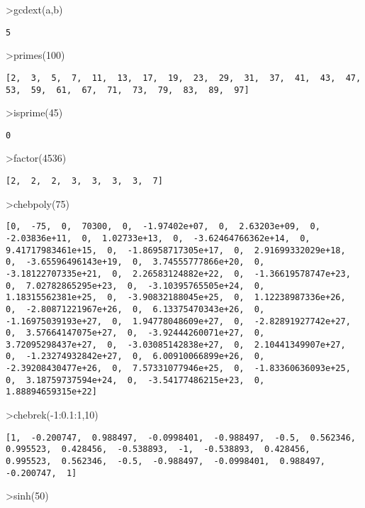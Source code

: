 \documentclass[
]{book}
\begin{document}
\textgreater gcdext(a,b)

\begin{verbatim}
5
\end{verbatim}

\textgreater primes(100)

\begin{verbatim}
[2,  3,  5,  7,  11,  13,  17,  19,  23,  29,  31,  37,  41,  43,  47,
53,  59,  61,  67,  71,  73,  79,  83,  89,  97]
\end{verbatim}

\textgreater isprime(45)

\begin{verbatim}
0
\end{verbatim}

\textgreater factor(4536)

\begin{verbatim}
[2,  2,  2,  3,  3,  3,  3,  7]
\end{verbatim}

\textgreater chebpoly(75)

\begin{verbatim}
[0,  -75,  0,  70300,  0,  -1.97402e+07,  0,  2.63203e+09,  0,
-2.03836e+11,  0,  1.02733e+13,  0,  -3.62464766362e+14,  0,
9.41717983461e+15,  0,  -1.86958717305e+17,  0,  2.91699332029e+18,
0,  -3.65596496143e+19,  0,  3.74555777866e+20,  0,
-3.18122707335e+21,  0,  2.26583124882e+22,  0,  -1.36619578747e+23,
0,  7.02782865295e+23,  0,  -3.10395765505e+24,  0,
1.18315562381e+25,  0,  -3.90832188045e+25,  0,  1.12238987336e+26,
0,  -2.80871221967e+26,  0,  6.13375470343e+26,  0,
-1.16975039193e+27,  0,  1.94778048609e+27,  0,  -2.82891927742e+27,
0,  3.57664147075e+27,  0,  -3.92444260071e+27,  0,
3.72095298437e+27,  0,  -3.03085142838e+27,  0,  2.10441349907e+27,
0,  -1.23274932842e+27,  0,  6.00910066899e+26,  0,
-2.39208430477e+26,  0,  7.57331077946e+25,  0,  -1.83360636093e+25,
0,  3.18759737594e+24,  0,  -3.54177486215e+23,  0,  1.88894659315e+22]
\end{verbatim}

\textgreater chebrek(-1:0.1:1,10)

\begin{verbatim}
[1,  -0.200747,  0.988497,  -0.0998401,  -0.988497,  -0.5,  0.562346,
0.995523,  0.428456,  -0.538893,  -1,  -0.538893,  0.428456,
0.995523,  0.562346,  -0.5,  -0.988497,  -0.0998401,  0.988497,
-0.200747,  1]
\end{verbatim}

\textgreater sinh(50)
\end{document}
